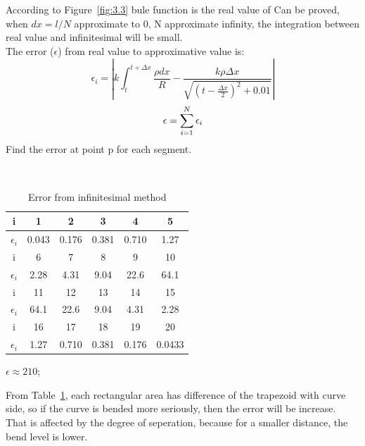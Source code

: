 \documentclass[10pt, journal, final]{IEEEtran}
\begin{document}
According to Figure~\ref{fig:3.3} bule function is the real value of
Can be proved, when $dx = l / N$ approximate to 0, N approximate infinity,
the integration between real value and infinitesimal will be small.\\

The error ($\epsilon$) from real value to approximative value is:
\begin{equation}
    \epsilon_i =\left| k\int_{t}^{t+\Delta x} \frac{\rho dx}{R} -  \frac{k \rho \Delta x}{\sqrt{(t - \frac{\Delta x}{2})^2 + 0.01}} \right |
\end{equation}
\begin{equation}
    \epsilon = \sum_{i=1}^{N}{\epsilon_i}                                      \\
\end{equation}
Find the error at point p for each segment.

\begin{table}[htbp]
    \renewcommand{\arraystretch}{1.3}
    \caption{Error from infinitesimal method}
    \label{tab:error1}
    \centering\

    \begin{tabular}{|c|c|c|c|c|c|}
        \hline
        i             & 1     & 2     & 3     & 4     & 5      \\
        \hline
        $\epsilon_i $ & 0.043 & 0.176 & 0.381 & 0.710 & 1.27   \\
        \hline
        i             & 6     & 7     & 8     & 9     & 10     \\
        \hline
        $\epsilon_i $ & 2.28  & 4.31  & 9.04  & 22.6  & 64.1   \\
        \hline
        i             & 11    & 12    & 13    & 14    & 15     \\
        \hline
        $\epsilon_i $ & 64.1  & 22.6  & 9.04  & 4.31  & 2.28   \\
        \hline
        i             & 16    & 17    & 18    & 19    & 20     \\
        \hline
        $\epsilon_i $ & 1.27  & 0.710 & 0.381 & 0.176 & 0.0433 \\
        \hline
    \end{tabular}
\end{table}

$\epsilon \approx 210$;

From Table~\ref{tab:error1}, each rectangular area has difference of the trapezoid with curve side,
so if the curve is bended more seriously, then the error will be increase.
That is affected by the degree of seperation, because for a smaller distance, the bend level is lower.
\end{document}
